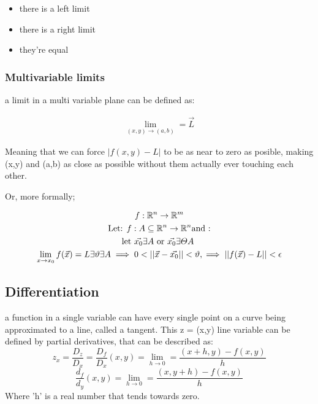 \documentclass[11pt,fleqn]{book} %
\begin{document}
\begin{itemize}
    \item there is a left limit
    \item there is a right limit
    \item they're equal
\end{itemize}


\subsubsection{Multivariable limits}

a limit in a multi variable plane can be defined as: 

\begin{gather}
    \lim_{(x,y) \to (a,b)} = \vec{L}
\end{gather}

Meaning that we can force $ |f(x,y)-L|$ to be as near to zero as posible, making
(x,y) and (a,b) as close as possible without them actually ever touching each other.

Or, more formally;

\begin{gather}
    f: \mathbb{R}^n \to \mathbb{R}^m \\
    \text{Let: } f: A \subseteq \mathbb{R}^n \rightarrow \mathbb{R}^n \text{and :}\\
    \text{let $ \vec{x_0} \exists A $ or $ \vec{x_0} \exists \varTheta A $ }\\
    \lim_{x \to x_0} f(\vec{x}) = L \exists \vartheta \exists A \implies 0 < ||\vec{x} - \vec{x_0}|| < \vartheta, \implies ||f(\vec{x})-L||<\epsilon
\end{gather}

\subsection{Differentiation}

a function in a single variable can have every single point on a curve being approximated to
a line, called a tangent. This z = (x,y) line variable can be defined by partial derivatives, that
can be described as:
\begin{equation}
    z_x = \frac{D_z}{D_x} = \frac{D_f}{D_x} (x,y) = \lim_{h \to 0} = \frac{(x+h,y)-f(x,y)}{h} 
\end{equation}
\begin{equation}
    \frac{d_f}{d_y}(x,y) = \lim_{h \to 0} = \frac{(x,y+h)-f(x,y)}{h}
\end{equation}
Where 'h' is a real number that tends towards zero.
\end{document}
